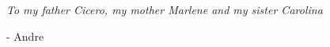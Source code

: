 \null\vfill
\textit{To my father Cicero, my mother Marlene and my sister Carolina}

\begin{flushright}
- Andre
\end{flushright}

\vfill\vfill\vfill\vfill\vfill\vfill\null
\clearpage  %